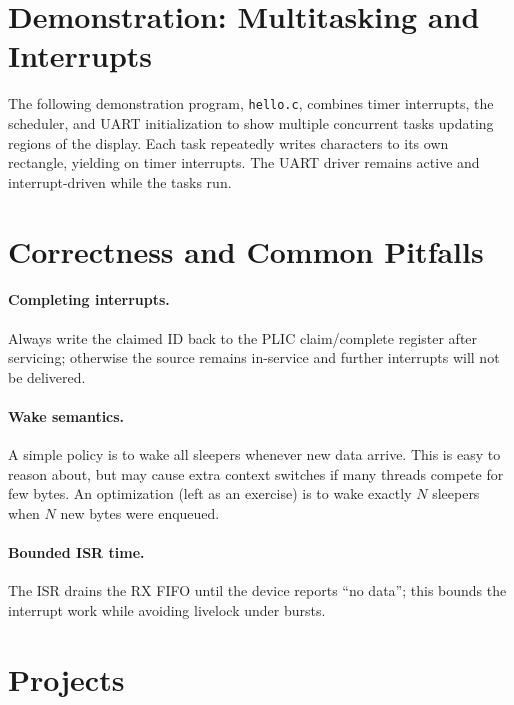 \section{Demonstration: Multitasking and Interrupts}

The following demonstration program, \texttt{hello.c}, combines timer interrupts, the scheduler,
and UART initialization to show multiple concurrent tasks updating regions of the display.
Each task repeatedly writes characters to its own rectangle, yielding on timer interrupts.
The UART driver remains active and interrupt-driven while the tasks run.

\begin{figure}[H]
\centering

\end{figure}

\section{Correctness and Common Pitfalls}

\paragraph{Completing interrupts.}
Always write the claimed ID back to the PLIC claim/complete register after servicing; otherwise the
source remains in-service and further interrupts will not be delivered.

\paragraph{Wake semantics.}
A simple policy is to wake all sleepers whenever new data arrive. This is easy to reason about, but
may cause extra context switches if many threads compete for few bytes. An optimization (left as an
exercise) is to wake exactly $N$ sleepers when $N$ new bytes were enqueued.

\paragraph{Bounded ISR time.}
The ISR drains the RX FIFO until the device reports “no data”; this bounds the interrupt work while
avoiding livelock under bursts.

\section*{Projects}

